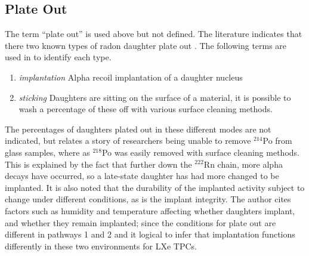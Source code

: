 
\subsection{Plate Out}
The term ``plate out'' is used above but not defined. The literature indicates that there two known types of radon daughter plate out \cite{Samuelsson1996}. The following terms are used in  \cite{Samuelsson1996} to identify each type.

\begin{enumerate}
\item \textit{implantation} Alpha recoil implantation of a daughter nucleus
\item \textit{sticking} Daughters are sitting on the surface of a material, it is possible to wash a percentage of these off with various surface cleaning methods.
\end{enumerate}

The percentages of daughters plated out in these different modes are not indicated, but \cite{Samuelsson1996} relates a story of researchers being unable to remove $^{214}$Po from glass samples, where as $^{218}$Po was easily removed with surface cleaning methods. This is explained by the fact that further down the $^{222}$Rn chain, more alpha decays have occurred, so a late-state daughter has had more changed to be implanted. It is also noted that the  durability of the implanted activity subject to change under different conditions, as is the implant integrity. The author cites factors such as humidity and temperature affecting whether daughters implant, and whether they remain implanted; since the conditions for plate out are different in pathways 1 and 2 and it logical to infer that implantation functions differently in these two environments for \ac{LXe} \ac{TPC}s. 

